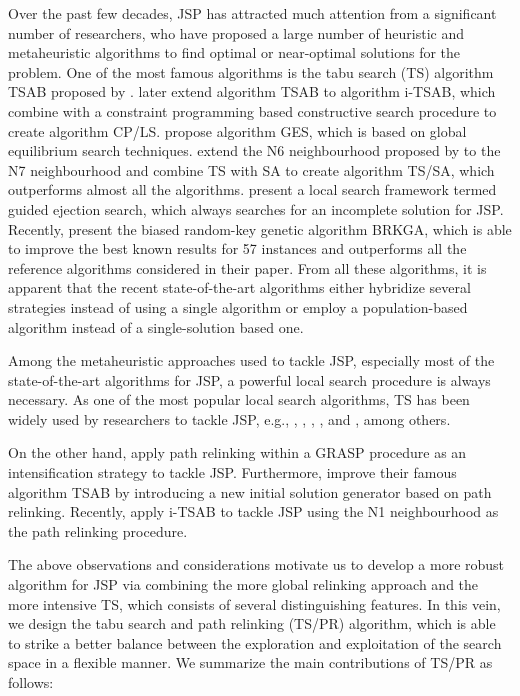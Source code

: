 \documentclass[authoryear,12pt]{elsarticle}
\begin{document}
Over the past few decades, JSP has attracted much attention from a significant number of researchers, who have proposed a large number of heuristic and metaheuristic algorithms to find optimal or near-optimal solutions for the problem. One of the most famous algorithms is the tabu search (TS) algorithm TSAB proposed by \cite{Nowicki1996TSAB}. \cite{Nowicki2005i-TSAB} later extend algorithm TSAB to algorithm i-TSAB, which \cite{Beck2011CP/LS} combine with a constraint programming based constructive search procedure to create algorithm CP/LS. \cite{Pardalos2006GES} propose algorithm GES, which is based on global equilibrium search techniques. \cite{Zhang2007TS} extend the N6 neighbourhood proposed by \cite{Balas1998GLS} to the N7 neighbourhood and \cite{Zhang2008TSSA} combine TS with SA to create algorithm TS/SA, which outperforms almost all the algorithms. \cite{Nagata2009GES} present a local search framework termed guided ejection search, which always searches for an incomplete solution for JSP. Recently, \cite{Goncalves2013BRKGA} present the biased random-key genetic algorithm BRKGA, which is able to improve the best known results for 57 instances and outperforms all the reference algorithms considered in their paper. From all these algorithms, it is apparent that the recent state-of-the-art algorithms either hybridize several strategies instead of using a single algorithm or employ a population-based algorithm instead of a single-solution based one.

Among the metaheuristic approaches used to tackle JSP, especially most of the state-of-the-art algorithms for JSP, a powerful local search procedure is always necessary. As one of the most popular local search algorithms, TS has been widely used by researchers to tackle JSP, e.g., \cite{Nowicki2005i-TSAB}, \cite{Zhang2007TS}, \cite{Nasiri2012GES/TS}, \cite{Shen201214}, and \cite{Goncalves2013BRKGA}, among others.

On the other hand, \cite{Aiex2003GRASPwithPR} apply path relinking within a GRASP procedure as an intensification strategy to tackle JSP. Furthermore, \cite{Nowicki2005i-TSAB} improve their famous algorithm TSAB by introducing a new initial solution generator based on path relinking. Recently, \cite{Nasiri2012guidedTSPR} apply i-TSAB to tackle JSP using the N1 neighbourhood as the path relinking procedure.


The above observations and considerations motivate us to develop a more robust algorithm for JSP via combining the more global relinking approach and the more intensive TS, which consists of several distinguishing features. In this vein, we design the tabu search and path relinking (TS/PR) algorithm, which is able to strike a better balance between the exploration and exploitation of the search space in a flexible manner. We summarize the main contributions of TS/PR as follows:
\end{document}
